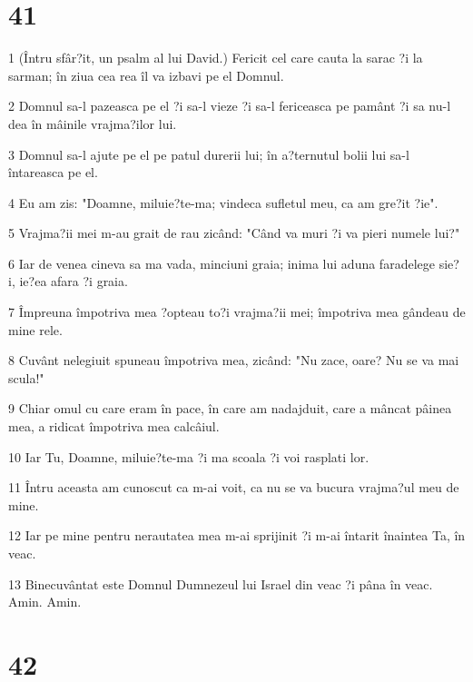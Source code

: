 \chapter{41}

\par 1 (Întru sfâr?it, un psalm al lui David.) Fericit cel care cauta la sarac ?i la sarman; în ziua cea rea îl va izbavi pe el Domnul.
\par 2 Domnul sa-l pazeasca pe el ?i sa-l vieze ?i sa-l fericeasca pe pamânt ?i sa nu-l dea în mâinile vrajma?ilor lui.
\par 3 Domnul sa-l ajute pe el pe patul durerii lui; în a?ternutul bolii lui sa-l întareasca pe el.
\par 4 Eu am zis: "Doamne, miluie?te-ma; vindeca sufletul meu, ca am gre?it ?ie".
\par 5 Vrajma?ii mei m-au grait de rau zicând: "Când va muri ?i va pieri numele lui?"
\par 6 Iar de venea cineva sa ma vada, minciuni graia; inima lui aduna faradelege sie?i, ie?ea afara ?i graia.
\par 7 Împreuna împotriva mea ?opteau to?i vrajma?ii mei; împotriva mea gândeau de mine rele.
\par 8 Cuvânt nelegiuit spuneau împotriva mea, zicând: "Nu zace, oare? Nu se va mai scula!"
\par 9 Chiar omul cu care eram în pace, în care am nadajduit, care a mâncat pâinea mea, a ridicat împotriva mea calcâiul.
\par 10 Iar Tu, Doamne, miluie?te-ma ?i ma scoala ?i voi rasplati lor.
\par 11 Întru aceasta am cunoscut ca m-ai voit, ca nu se va bucura vrajma?ul meu de mine.
\par 12 Iar pe mine pentru nerautatea mea m-ai sprijinit ?i m-ai întarit înaintea Ta, în veac.
\par 13 Binecuvântat este Domnul Dumnezeul lui Israel din veac ?i pâna în veac. Amin. Amin.

\chapter{42}

